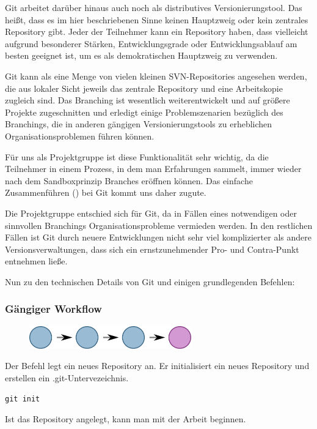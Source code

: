 Git arbeitet darüber hinaus auch noch als distributives Versionierungstool. Das heißt, dass es im hier beschriebenen Sinne keinen Hauptzweig oder kein zentrales Repository gibt.
Jeder der Teilnehmer kann ein Repository haben, dass vielleicht aufgrund besonderer Stärken, Entwicklungsgrade oder Entwicklungsablauf am besten geeignet ist, um es als demokratischen Hauptzweig zu verwenden.

Git kann als eine Menge von vielen kleinen SVN-Repositories angesehen werden, die aus lokaler Sicht jeweils das zentrale Repository und eine Arbeitskopie zugleich sind.
Das Branching ist wesentlich weiterentwickelt und auf größere Projekte zugeschnitten und erledigt einige Problemszenarien bezüglich des Branchings, die in anderen gängigen Versionierungstools zu erheblichen Organisationsproblemen führen können.

Für uns als Projektgruppe ist diese Funktionalität sehr wichtig, da die Teilnehmer in einem Prozess, in dem man Erfahrungen sammelt, immer wieder nach dem Sandboxprinzip Branches eröffnen können. Das einfache Zusammenführen () bei Git kommt uns daher zugute.

Die Projektgruppe entschied sich für Git, da in Fällen eines notwendigen oder sinnvollen Branchings Organisationsprobleme vermieden werden.
In den restlichen Fällen ist Git durch neuere Entwicklungen nicht sehr viel komplizierter als andere Versionsverwaltungen, dass sich ein ernstzunehmender Pro- und Contra-Punkt entnehmen ließe.

Nun zu den technischen Details von Git und einigen grundlegenden Befehlen:

\subsubsection{Gängiger Workflow}

\begin{figure}[htb]
\begin{center}
\includegraphics[width=7cm]{bilder/straight.pdf}
\end{center} 
\end{figure}

Der Befehl  legt ein neues Repository an. Er initialisiert ein neues Repository und erstellen ein .git-Untervezeichnis.
\begin{verbatim}
git init
\end{verbatim}
Ist das Repository angelegt, kann man mit der Arbeit beginnen.

